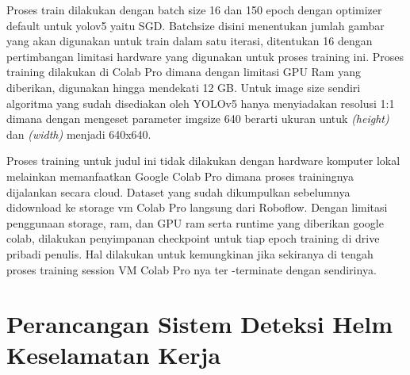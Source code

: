 Proses train dilakukan dengan batch size 16 dan 150 epoch dengan optimizer default untuk yolov5 yaitu SGD. Batch\textunderscore size disini menentukan jumlah gambar yang akan digunakan untuk train dalam satu iterasi, ditentukan 16 dengan pertimbangan limitasi hardware yang digunakan untuk proses training ini. Proses training dilakukan di Colab Pro dimana dengan limitasi GPU Ram yang diberikan, digunakan hingga mendekati 12 GB. Untuk image size sendiri algoritma yang sudah disediakan oleh YOLOv5 hanya menyiadakan resolusi 1:1 dimana dengan mengeset parameter imgsize 640 berarti ukuran untuk \emph{(height)} dan \emph{(width)} menjadi 640x640.

Proses training untuk judul ini tidak dilakukan dengan hardware komputer lokal melainkan memanfaatkan Google Colab Pro dimana proses trainingnya dijalankan secara cloud. 
Dataset yang sudah dikumpulkan sebelumnya didownload ke storage vm Colab Pro langsung dari Roboflow.  Dengan limitasi penggunaan storage, ram, dan GPU ram serta runtime yang diberikan google colab, dilakukan penyimpanan checkpoint untuk tiap epoch training di drive pribadi penulis. Hal dilakukan untuk kemungkinan jika sekiranya di tengah proses training session VM Colab Pro nya ter -terminate dengan sendirinya. 


\section{Perancangan Sistem Deteksi Helm Keselamatan Kerja}
\label{sec:perancangansistem}

